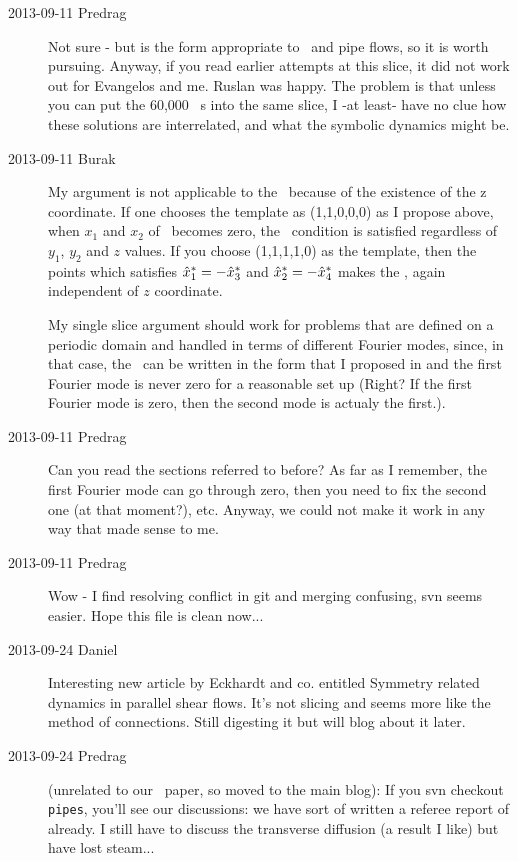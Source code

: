 \begin{description}
\item[2013-09-11 Predrag] Not sure - but  is
the form appropriate to \KS\ and pipe flows, so it is worth pursuing.
Anyway, if you read earlier attempts at this slice, it did not work
out for Evangelos and me. Ruslan was happy. The problem is that
unless you can put the 60,000 \KS\ \rpo s into the same slice, I -at
least- have no clue how these solutions are interrelated, and what
the symbolic dynamics might be.

\item[2013-09-11 Burak] My argument is not applicable to the \cLf\ because of the existence of the z coordinate. If one chooses the template as (1,1,0,0,0) as I propose above, when $x_1$ and $x_2$ of \cLf\ becomes zero, the \chartBord\ condition is satisfied regardless of $y_1$, $y_2$ and $z$ values. If you choose (1,1,1,1,0) as the template, then the points which satisfies $\hat{x}_1^* = -\hat{x}_3^*$ and $\hat{x}_2^* = -\hat{x}_4^*$  makes the \chartBord , again independent of $z$ coordinate.

My single slice argument should work for problems that are defined on a periodic domain and handled in terms of different Fourier modes, since, in that case, the \Lg\ can be written in the form that I proposed in  and the first Fourier mode is never zero for a reasonable set up (Right? If the first Fourier mode is zero, then the second mode is actualy the first.).

\item[2013-09-11 Predrag] Can you read the sections referred to before?
As far as I remember, the first Fourier mode can go through zero, then you need
to fix the second one (at that moment?), etc. Anyway, we could not make it work
in any way that made sense to me.

\item[2013-09-11 Predrag] Wow - I find resolving conflict in git and merging confusing,
svn seems easier. Hope this file is clean now...

\item[2013-09-24 Daniel] Interesting new article by Eckhardt and co.
    entitled  {Symmetry related
    dynamics in parallel shear flows}. It's not slicing and
    seems more like the method of connections. Still digesting it but
    will blog about it later.

\item[2013-09-24 Predrag] (unrelated to our \twoMode\ paper, so moved
    to the main blog): If you svn checkout \texttt{pipes}, you'll see our
    discussions: we have sort of written a referee report of
     already. I still have to discuss the transverse
    diffusion (a result I like) but have lost steam...


\end{description}
